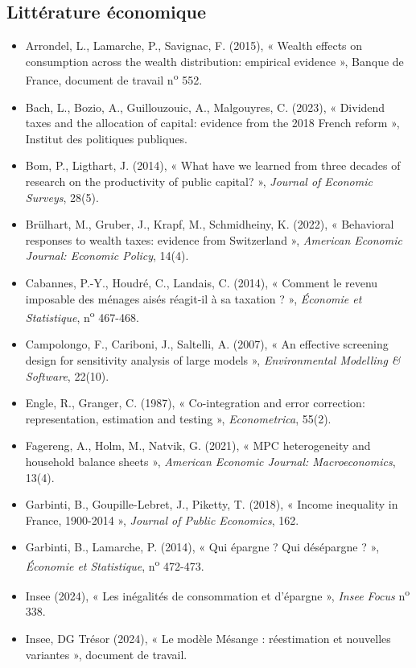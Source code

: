 \begin{small}
\section*{Littérature économique}
\begin{itemize}[leftmargin=1em]
\item Arrondel, L., Lamarche, P., Savignac, F. (2015), « Wealth effects on consumption across the wealth distribution:
empirical evidence », Banque de France, document de travail n\textsuperscript{o} 552.
\item Bach, L., Bozio, A., Guillouzouic, A., Malgouyres, C. (2023), « Dividend taxes and the allocation of capital: evidence
from the 2018 French reform », Institut des politiques publiques.
\item Bom, P., Ligthart, J. (2014), « What have we learned from three decades of research on the productivity of public
capital? », \emph{Journal of Economic Surveys}, 28(5).
\item Brülhart, M., Gruber, J., Krapf, M., Schmidheiny, K. (2022), « Behavioral responses to wealth taxes: evidence from
Switzerland », \emph{American Economic Journal: Economic Policy}, 14(4).
\item Cabannes, P.-Y., Houdré, C., Landais, C. (2014), « Comment le revenu imposable des ménages aisés réagit-il à sa
taxation ? », \emph{Économie et Statistique}, n\textsuperscript{o} 467-468.
\item Campolongo, F., Cariboni, J., Saltelli, A. (2007), « An effective screening design for sensitivity analysis of large
models », \emph{Environmental Modelling \& Software}, 22(10).
\item Engle, R., Granger, C. (1987), « Co-integration and error correction: representation, estimation and testing »,
\emph{Econometrica}, 55(2).
\item Fagereng, A., Holm, M., Natvik, G. (2021), « MPC heterogeneity and household balance sheets », \emph{American
Economic Journal: Macroeconomics}, 13(4).
\item Garbinti, B., Goupille-Lebret, J., Piketty, T. (2018), « Income inequality in France, 1900-2014 », \emph{Journal of
Public Economics}, 162.
\item Garbinti, B., Lamarche, P. (2014), « Qui épargne ? Qui désépargne ? », \emph{Économie et Statistique},
n\textsuperscript{o} 472-473.
\item Insee (2024), « Les inégalités de consommation et d'épargne », \emph{Insee Focus} n\textsuperscript{o} 338.
\item Insee, DG Trésor (2024), « Le modèle Mésange : réestimation et nouvelles variantes », document de travail.

\end{itemize}
\end{small}
